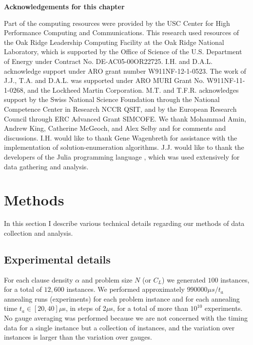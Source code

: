 \textbf{Acknowledgements for this chapter}

Part of the computing resources were provided by the USC Center for High Performance Computing and Communications.  This research used resources of the Oak Ridge Leadership Computing Facility at the Oak Ridge National Laboratory, which is supported by the Office of Science of the U.S. Department of Energy under Contract No. DE-AC05-00OR22725. I.H. and D.A.L. acknowledge support under ARO grant number W911NF-12-1-0523. The work of J.J., T.A. and D.A.L. was supported under ARO MURI Grant No. W911NF-11-1-0268, and the Lockheed Martin Corporation. M.T. and T.F.R. acknowledges support by the Swiss National Science Foundation through the National Competence Center in Research NCCR QSIT, and by the European Research Council through ERC Advanced Grant SIMCOFE. We thank Mohammad Amin, Andrew King, Catherine McGeoch, and Alex Selby and  for comments and discussions. I.H. would like to thank Gene Wagenbreth for assistance with the implementation of solution-enumeration algorithms.  J.J. would like to thank the developers of the Julia programming language \cite{Bezanson:2014}, which was used extensively for data gathering and analysis.


\section{Methods}
\label{app:methods}
In this section I describe various technical details regarding our methods of data collection and analysis.

\subsection{Experimental details}
For each clause density $\alpha$ and problem size $N$ (or $C_L$) we generated $100$ instances, for a total of $12,\!600$ instances. We performed approximately $990000 \mu s/t_a$ annealing runs (experiments) for each problem instance and for each annealing time $t_a \in [20,40]\mu$s, in steps of 2$\mu$s, for a total of more than $10^{10}$ experiments. No gauge averaging \cite{q108} was performed because we are not concerned with the timing data for a single instance but a collection of instances, and the variation over instances is larger than the variation over gauges.

